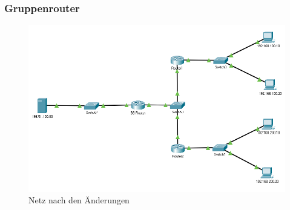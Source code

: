 \subsubsection{Gruppenrouter}
\begin{figure}[!htb]
    \centering
    \includegraphics[width=\textwidth]{./build/build.png}
    \caption{Netz nach den Änderungen}
\end{figure}



